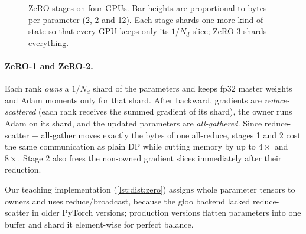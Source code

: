 \begin{figure}[t]
\centering
{}
\caption{ZeRO stages on four GPUs. Bar heights are proportional to bytes per parameter (2, 2
and 12). Each stage shards one more kind of state so that every GPU keeps only its $1/N_d$
slice; ZeRO-3 shards everything.}
\label{fig:dist:zero}
\end{figure}

\paragraph{ZeRO-1 and ZeRO-2.} Each rank \emph{owns} a $1/N_d$ shard of the parameters and keeps
fp32 master weights and Adam moments only for that shard. After backward, gradients are
\emph{reduce-scattered} (each rank receives the summed gradient of its shard), the owner runs
Adam on its shard, and the updated parameters are \emph{all-gathered}. Since reduce-scatter +
all-gather moves exactly the bytes of one all-reduce, stages 1 and 2 cost the same
communication as plain DP while cutting memory by up to $4\times$ and $8\times$. Stage 2 also
frees the non-owned gradient slices immediately after their reduction.

Our teaching implementation (\cref{lst:dist:zero}) assigns whole parameter tensors to owners
and uses reduce/broadcast, because the gloo backend lacked reduce-scatter in older PyTorch versions; production versions
flatten parameters into one buffer and shard it element-wise for perfect balance.

